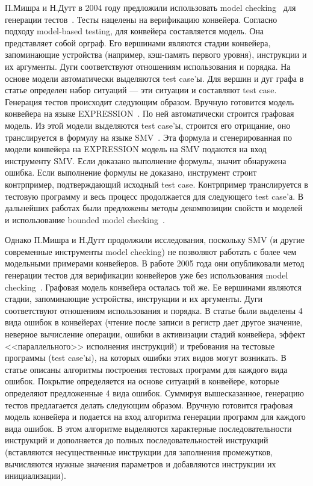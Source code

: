 
П.Мишра и Н.Дутт в 2004 году предложили использовать model checking~\cite{ModelChecking} для генерации тестов~\cite{MishraDutt04}. Тесты нацелены на верификацию конвейера. Согласно подходу model-based testing, для конвейера составляется модель. Она представляет собой орграф. Его вершинами являются стадии конвейера, запоминающие устройства (например, кэш-память первого уровня), инструкции и их аргументы. Дуги соответствуют отношениям использования и порядка. На основе модели автоматически выделяются test case'ы. Для вершин и дуг графа в статье определен набор ситуаций --- эти ситуации и составляют test case. Генерация тестов происходит следующим образом. Вручную готовится модель конвейера на языке EXPRESSION~\cite{EXPRESSION}. По ней автоматически строится графовая модель. Из этой модели выделяются test case'ы, строится его отрицание, оно транслируется в формулу на языке SMV~\cite{SMV}. Эта формула и сгенерированная по модели конвейера на EXPRESSION модель на SMV подаются на вход инструменту SMV. Если доказано выполнение формулы, значит обнаружена ошибка. Если выполнение формулы не доказано, инструмент строит контрпример, подтверждающий исходный test case. Контрпример транслируется в тестовую программу и весь процесс продолжается для следующего test case'а. В дальнейших работах были предложены методы декомпозиции свойств и моделей и использование bounded model checking~\cite{Mishra09}.

Однако П.Мишра и Н.Дутт продолжили исследования, поскольку SMV (и другие современные инструменты model checking) не позволяют работать с более чем модельными примерами конвейеров. В работе 2005 года они опубликовали метод генерации тестов для верификации конвейеров уже без использования model checking~\cite{MishraDutt05}. Графовая модель конвейера осталась той же. Ее вершинами являются стадии, запоминающие устройства, инструкции и их аргументы. Дуги соответствуют отношениям использования и порядка. В статье были выделены 4 вида ошибок в конвейерах (чтение после записи в регистр дает другое значение, неверное вычисление операции, ошибки в активизации стадий конвейера, эффект <<параллельного>> исполнения инструкций) и требования на тестовые программы (test case'ы), на которых ошибки этих видов могут возникать. В статье описаны алгоритмы построения тестовых программ для каждого вида ошибок. Покрытие определяется на основе ситуаций в конвейере, которые определяют предложенные 4 вида ошибок. Суммируя вышесказанное, генерацию тестов предлагается делать следующим образом. Вручную готовится графовая модель конвейера и подается на вход алгоритма генерации программ для каждого вида ошибок. В этом алгоритме выделяются характерные последовательности инструкций и  дополняется до полных последовательностей инструкций (вставляются несущественные инструкции для заполнения промежутков, вычисляются нужные значения параметров и добавляются инструкции их инициализации).

